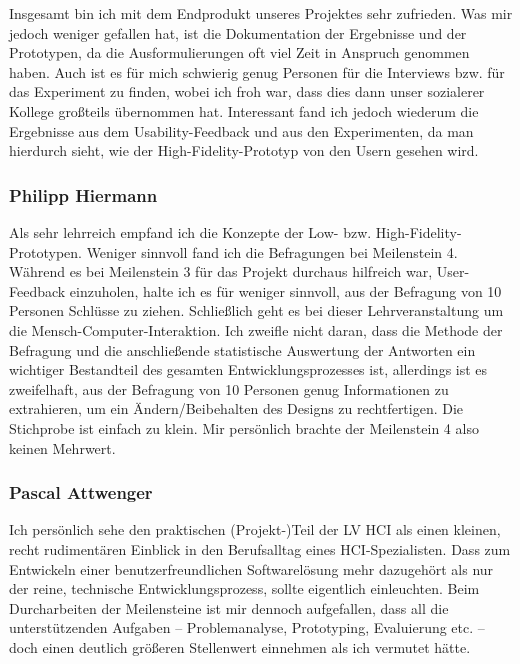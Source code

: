 \documentclass[a4paper,10pt]{scrartcl}
\begin{document}
\medskip

Insgesamt bin ich mit dem Endprodukt unseres Projektes sehr zufrieden. Was mir jedoch weniger gefallen hat, ist die Dokumentation der Ergebnisse und der Prototypen, da
die Ausformulierungen oft viel Zeit in Anspruch genommen haben. Auch ist es für mich schwierig genug Personen für die Interviews bzw. für das Experiment zu finden, wobei
ich froh war, dass dies dann unser sozialerer Kollege großteils übernommen hat. Interessant fand ich jedoch wiederum die Ergebnisse aus dem Usability-Feedback und aus den Experimenten,
da man hierdurch sieht, wie der High-Fidelity-Prototyp von den Usern gesehen wird.

\subsubsection{Philipp Hiermann}

Als sehr lehrreich empfand ich die Konzepte der Low- bzw. High-Fidelity-Prototypen. 
Weniger sinnvoll fand ich die Befragungen bei Meilenstein 4. Während es bei Meilenstein 3 für das Projekt durchaus hilfreich war, User-Feedback einzuholen, halte ich es für weniger sinnvoll, aus der Befragung von 10 Personen Schlüsse zu ziehen. Schließlich geht es bei dieser Lehrveranstaltung um die Mensch-Computer-Interaktion. Ich zweifle nicht daran, dass die Methode der Befragung und die anschließende statistische Auswertung der Antworten ein wichtiger Bestandteil des gesamten Entwicklungsprozesses ist, allerdings ist es zweifelhaft, aus der Befragung von 10 Personen genug Informationen zu extrahieren, um ein Ändern/Beibehalten des Designs zu rechtfertigen. Die Stichprobe ist einfach zu klein. Mir persönlich brachte der Meilenstein 4 also keinen Mehrwert.

\subsubsection{Pascal Attwenger}

Ich persönlich sehe den praktischen (Projekt-)Teil der LV HCI als einen kleinen, recht rudimentären Einblick in den Berufsalltag eines HCI-Spezialisten. Dass zum Entwickeln einer benutzerfreundlichen Softwarelösung mehr dazugehört als nur der reine, technische Entwicklungsprozess, sollte eigentlich einleuchten. Beim Durcharbeiten der Meilensteine ist mir dennoch aufgefallen, dass all die unterstützenden Aufgaben -- Problemanalyse, Prototyping, Evaluierung etc. -- doch einen deutlich größeren Stellenwert einnehmen als ich vermutet hätte.
\end{document}
